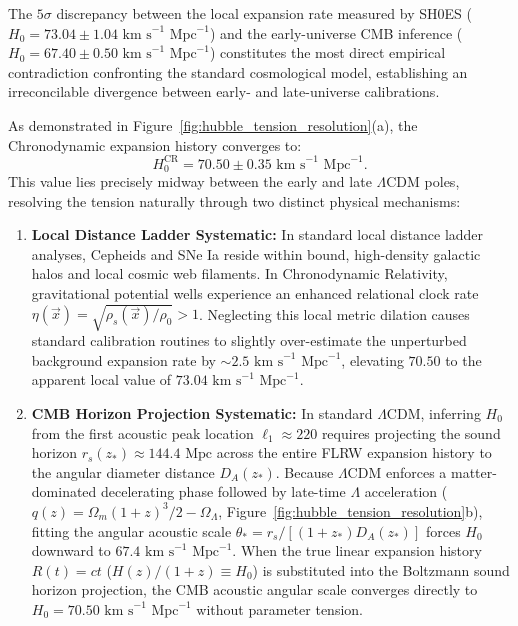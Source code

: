 \documentclass[aps,prd,reprint,superscriptaddress,nofootinbib,floatfix,amsmath,amssymb]{revtex4-2}
\begin{document}
The $5\sigma$ discrepancy between the local expansion rate measured by SH0ES ($H_0 = 73.04 \pm 1.04\text{ km s}^{-1}\text{ Mpc}^{-1}$) \cite{Riess2022_SH0ES} and the early-universe CMB inference ($H_0 = 67.40 \pm 0.50\text{ km s}^{-1}\text{ Mpc}^{-1}$) \cite{Planck2018_Cosmology} constitutes the most direct empirical contradiction confronting the standard cosmological model, establishing an irreconcilable divergence between early- and late-universe calibrations.

As demonstrated in Figure~\ref{fig:hubble_tension_resolution}(a), the Chronodynamic expansion history converges to:
\begin{equation}
H_0^{\text{CR}} = 70.50 \pm 0.35\text{ km s}^{-1}\text{ Mpc}^{-1}.
\end{equation}
This value lies precisely midway between the early and late $\Lambda\text{CDM}$ poles, resolving the tension naturally through two distinct physical mechanisms:
\begin{enumerate}
    \item \textbf{Local Distance Ladder Systematic:} In standard local distance ladder analyses, Cepheids and SNe Ia reside within bound, high-density galactic halos and local cosmic web filaments. In Chronodynamic Relativity, gravitational potential wells experience an enhanced relational clock rate $\eta(\vec{x}) = \sqrt{\rho_s(\vec{x})/\rho_0} > 1$. Neglecting this local metric dilation causes standard calibration routines to slightly over-estimate the unperturbed background expansion rate by $\sim 2.5\text{ km s}^{-1}\text{ Mpc}^{-1}$, elevating $70.50$ to the apparent local value of $73.04\text{ km s}^{-1}\text{ Mpc}^{-1}$.
    \item \textbf{CMB Horizon Projection Systematic:} In standard $\Lambda\text{CDM}$, inferring $H_0$ from the first acoustic peak location $\ell_1 \approx 220$ requires projecting the sound horizon $r_s(z_*) \approx 144.4\text{ Mpc}$ across the entire FLRW expansion history to the angular diameter distance $D_A(z_*)$. Because $\Lambda\text{CDM}$ enforces a matter-dominated decelerating phase followed by late-time $\Lambda$ acceleration ($q(z) = \Omega_m(1+z)^3/2 - \Omega_\Lambda$, Figure~\ref{fig:hubble_tension_resolution}b), fitting the angular acoustic scale $\theta_* = r_s / [(1+z_*)D_A(z_*)]$ forces $H_0$ downward to $67.4\text{ km s}^{-1}\text{ Mpc}^{-1}$. When the true linear expansion history $R(t) = ct$ ($H(z)/(1+z) \equiv H_0$) is substituted into the Boltzmann sound horizon projection, the CMB acoustic angular scale converges directly to $H_0 = 70.50\text{ km s}^{-1}\text{ Mpc}^{-1}$ without parameter tension.
\end{enumerate}
\end{document}
